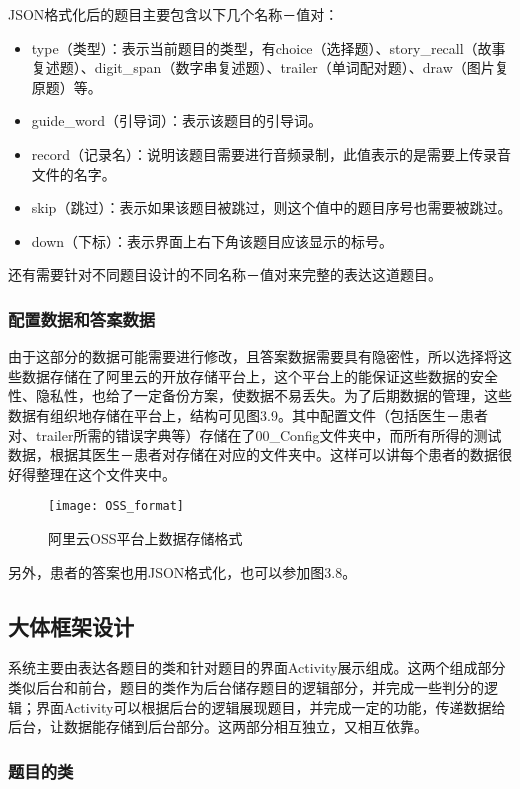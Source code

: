 JSON格式化后的题目主要包含以下几个名称－值对：

\begin{itemize}
\item type（类型）：表示当前题目的类型，有choice（选择题）、story\_recall（故事复述题）、digit\_span（数字串复述题）、trailer（单词配对题）、draw（图片复原题）等。
\item guide\_word（引导词）：表示该题目的引导词。
\item record（记录名）：说明该题目需要进行音频录制，此值表示的是需要上传录音文件的名字。
\item skip（跳过）：表示如果该题目被跳过，则这个值中的题目序号也需要被跳过。
\item down（下标）：表示界面上右下角该题目应该显示的标号。
\end{itemize}

还有需要针对不同题目设计的不同名称－值对来完整的表达这道题目。

\subsubsection{配置数据和答案数据}

由于这部分的数据可能需要进行修改，且答案数据需要具有隐密性，所以选择将这些数据存储在了阿里云的开放存储平台上，这个平台上的能保证这些数据的安全性、隐私性，也给了一定备份方案，使数据不易丢失。为了后期数据的管理，这些数据有组织地存储在平台上，结构可见图3.9。其中配置文件（包括医生－患者对、trailer所需的错误字典等）存储在了00\_Config文件夹中，而所有所得的测试数据，根据其医生－患者对存储在对应的文件夹中。这样可以讲每个患者的数据很好得整理在这个文件夹中。

\begin{figure}[h]
  \centering
  \texttt{[image: OSS\_format]}
  \caption{阿里云OSS平台上数据存储格式}
\end{figure}

另外，患者的答案也用JSON格式化，也可以参加图3.8。

\subsection{大体框架设计}

系统主要由表达各题目的类和针对题目的界面Activity展示组成。这两个组成部分类似后台和前台，题目的类作为后台储存题目的逻辑部分，并完成一些判分的逻辑；界面Activity可以根据后台的逻辑展现题目，并完成一定的功能，传递数据给后台，让数据能存储到后台部分。这两部分相互独立，又相互依靠。

\subsubsection{题目的类}

